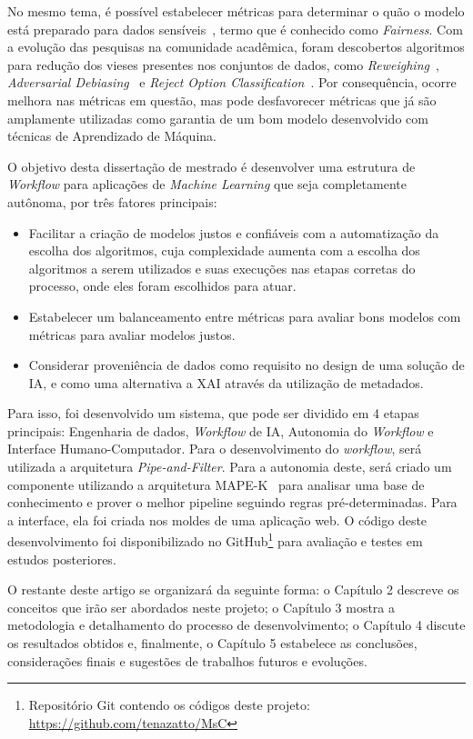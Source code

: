 \documentclass[twocolumn]{article}
\begin{document}
No mesmo tema, é possível estabelecer métricas para determinar o quão o modelo está preparado para dados sensíveis~\citep{Begley_2021}, termo que é conhecido como \textit{Fairness}. Com a evolução das pesquisas na comunidade acadêmica, foram descobertos algoritmos para redução dos vieses presentes nos conjuntos de dados, como \textit{Reweighing}~\citep{Kamiran_2011}, \textit{Adversarial Debiasing}~\citep{Zhang_2018} e \textit{Reject Option Classification}~\citep{Kamiran_2012}. Por consequência, ocorre melhora nas métricas em questão, mas pode desfavorecer métricas que já são amplamente utilizadas como garantia de um bom modelo desenvolvido com técnicas de Aprendizado de Máquina.

O objetivo desta dissertação de mestrado é desenvolver uma estrutura de \textit{Workflow} para aplicações de \textit{Machine Learning} que seja completamente autônoma, por três fatores principais:

\begin{itemize}
\item Facilitar a criação de modelos justos e confiáveis com a automatização da escolha dos algoritmos, cuja complexidade aumenta com a escolha dos algoritmos a serem utilizados e suas execuções nas etapas corretas do processo, onde eles foram escolhidos para atuar.
\item Estabelecer um balanceamento entre métricas para avaliar bons modelos com métricas para avaliar modelos justos.
\item Considerar proveniência de dados como requisito no design de uma solução de IA, e como uma alternativa a XAI através da utilização de metadados.
\end{itemize}

Para isso, foi desenvolvido um sistema, que pode ser dividido em 4 etapas principais: Engenharia de dados, \textit{Workflow} de IA, Autonomia do \textit{Workflow} e Interface Humano-Computador. Para o desenvolvimento do \textit{workflow}, será utilizada a arquitetura \textit{Pipe-and-Filter}. Para a autonomia deste, será criado um componente utilizando a arquitetura MAPE-K~\citep{IBM_2005} para analisar uma base de conhecimento e prover o melhor pipeline seguindo regras pré-determinadas. Para a interface, ela foi criada nos moldes de uma aplicação web. O código deste desenvolvimento foi disponibilizado no GitHub\footnote{Repositório Git contendo os códigos deste projeto: \url{https://github.com/tenazatto/MsC}} para avaliação e testes em estudos posteriores.

O restante deste artigo se organizará da seguinte forma: o Capítulo 2 descreve os conceitos que irão ser abordados neste projeto; o Capítulo 3 mostra a metodologia e detalhamento do processo de desenvolvimento; o Capítulo 4 discute os resultados obtidos e, finalmente, o Capítulo 5 estabelece as conclusões, considerações finais e sugestões de trabalhos futuros e evoluções.
\end{document}
